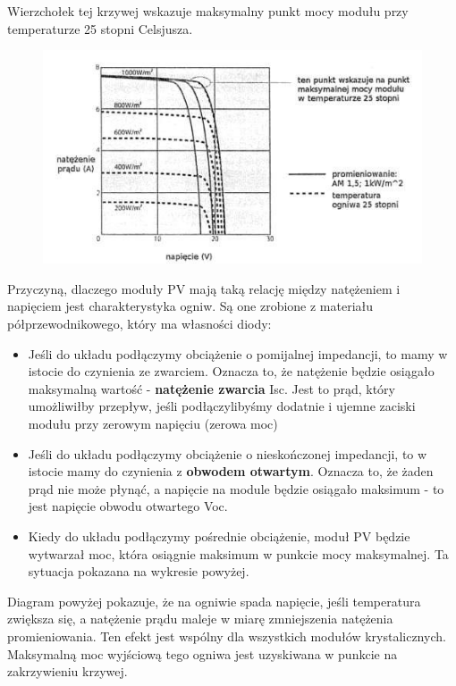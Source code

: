 \documentclass[12pt,a4paper]{article}
\begin{document}
Wierzchołek tej krzywej wskazuje maksymalny punkt mocy modułu przy 
temperaturze 25 stopni Celsjusza. 

\begin{figure}[h]
\centering
\includegraphics[natwidth=13.05cm,natheight=7.35cm]{media/image10.jpg}
\end{figure}
 
Przyczyną, dlaczego moduły PV mają taką relację między natężeniem i 
napięciem jest charakterystyka ogniw. Są one zrobione z materiału 
półprzewodnikowego, który ma własności diody: 

\begin{itemize}
\item Jeśli do układu podłączymy obciążenie o pomijalnej impedancji, to 
mamy w istocie do czynienia ze zwarciem. Oznacza to, że natężenie będzie 
osiągało maksymalną wartość - \textbf{natężenie zwarcia} Isc. Jest to prąd, który 
umożliwiłby przepływ, jeśli podłączylibyśmy dodatnie i ujemne zaciski 
modułu przy zerowym napięciu (zerowa moc) 
\item Jeśli do układu podłączymy obciążenie o nieskończonej impedancji, 
to w istocie mamy do czynienia z \textbf{obwodem otwartym}. Oznacza to, że żaden 
prąd nie może płynąć, a napięcie na module będzie osiągało maksimum - to 
jest napięcie obwodu otwartego Voc. 
\item Kiedy do układu podłączymy pośrednie obciążenie, moduł PV będzie 
wytwarzał moc, która osiągnie maksimum w punkcie mocy maksymalnej. Ta 
sytuacja pokazana na wykresie powyżej. 
\end{itemize}
 
Diagram powyżej pokazuje, że na ogniwie spada napięcie, jeśli 
temperatura zwiększa się, a natężenie prądu maleje w miarę zmniejszenia 
natężenia promieniowania. Ten efekt jest wspólny dla wszystkich modułów 
krystalicznych. Maksymalną moc wyjściową tego ogniwa jest uzyskiwana w 
punkcie na zakrzywieniu krzywej. 
\end{document}
